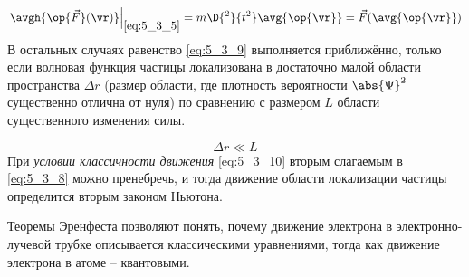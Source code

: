 \begin{equation}
\label{eq:5_3_9}
  \left. \avgh{\op{\vec{F}}(\vr)} \right|_{
    \eqref{eq:5_3_5}
  } = m \D{^2}{t^2} \avg{\op{\vr}} = \vec{F}(\avg{\op{\vr}})
\end{equation}%
%
В остальных случаях равенство \eqref{eq:5_3_9} выполняется приближённо, только если волновая функция частицы локализована в достаточно малой области пространства $\Delta r$ (размер области, где плотность вероятности $\abs{\Psi}^2$ существенно отлична от нуля) по сравнению с размером $L$ области существенного изменения силы.

\begin{equation}
\label{eq:5_3_10}
\Delta r \ll L
\end{equation}%
%
При {\em условии классичности движения} \eqref{eq:5_3_10} вторым слагаемым в \eqref{eq:5_3_8} можно пренебречь, и тогда движение области локализации частицы определится вторым законом Ньютона.

Теоремы Эренфеста позволяют понять, почему движение электрона в электронно-лучевой трубке описывается классическими уравнениями, тогда как движение электрона в атоме -- квантовыми.
